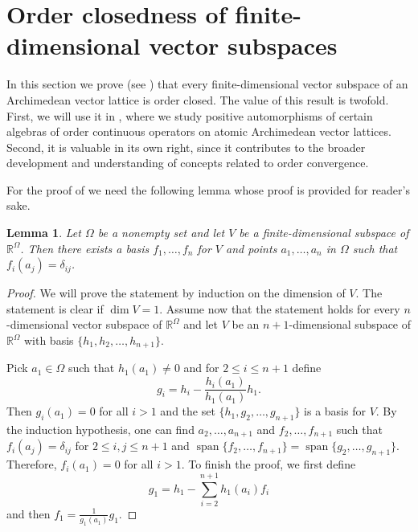 \documentclass[12pt,reqno]{amsart}
\theoremstyle{plain}
\newtheorem{lemma}[theorem]{Lemma}
\theoremstyle{definition}
\DeclareMathOperator{\Span}{span}
\begin{document}
\section{Order closedness of finite-dimensional vector subspaces}\label{Section: order closedness}

In this section we prove (see ) that every finite-dimensional vector subspace of an Archi\-me\-de\-an vector lattice is order closed. 
The value of this result is twofold. First, we will use it in , where we study positive automorphisms of certain algebras of order continuous operators on atomic Archimedean vector lattices. Second, it is valuable in its own right, since it contributes to the broader development and understanding of concepts related to order convergence. 

For the proof of  we need the following lemma whose proof is provided  for reader's sake. 

\begin{lemma}\label{delta_basis}
Let $\Omega$ be a nonempty set and let $V$ be a finite-dimensional subspace of $\mathbb R^\Omega$. Then there exists a basis $f_1,\ldots,f_n$ for $V$ and points $a_1,\ldots, a_n$ in $\Omega$ such that $f_i(a_j)=\delta_{ij}$.  
\end{lemma}

\begin{proof}
We will prove the statement by induction on the dimension of $V$. The statement is clear if $\dim V=1$. 
Assume now that the statement holds for every $n$-dimensional vector subspace of $\mathbb R^\Omega$ and let $V$ be an $n+1$-dimensional subspace of $\mathbb R^\Omega$ with basis $\{h_1,h_2,\ldots, h_{n+1}\}$. 

Pick $a_{1}\in \Omega$ such that $h_{1}(a_{1})\neq 0$  
and for $2\leq i\leq n+1$ define  
$$g_i = h_i - \frac{h_i(a_1)}{h_{1}(a_{1})}h_{1}.$$
Then $g_i(a_1)=0$ for all $i>1$ and the set $\{h_1,g_2,\ldots,g_{n+1}\}$ is a basis for $V$. 
By the induction hypothesis, one can find $a_2,\ldots,a_{n+1}$ and $f_2,\ldots,f_{n+1}$ such that 
$f_i(a_j)=\delta_{ij}$ for $2\leq i,j \leq n+1$ and $\Span\{f_2,\ldots,f_{n+1}\}=\Span\{g_2,\ldots,g_{n+1}\}$.
Therefore, $f_i(a_1)=0$ for all $i>1$.
To finish the proof, we first define
$$g_1 = h_1 - \sum_{i=2}^{n+1} h_1(a_i)f_i$$ and then 
$f_1=\frac{1}{g_1(a_1)}g_1$.
\end{proof}
 
\end{document}
